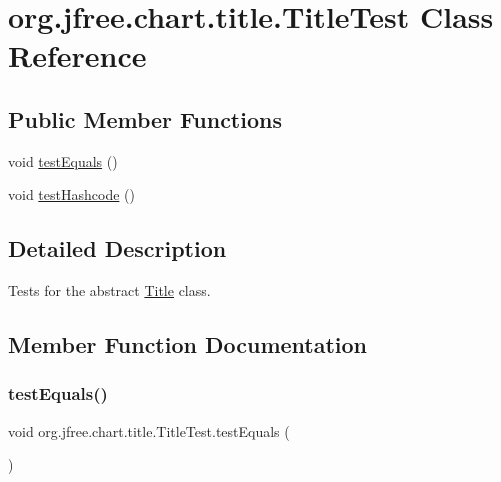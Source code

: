 \hypertarget{classorg_1_1jfree_1_1chart_1_1title_1_1_title_test}{}\section{org.\+jfree.\+chart.\+title.\+Title\+Test Class Reference}
\label{classorg_1_1jfree_1_1chart_1_1title_1_1_title_test}
\subsection*{Public Member Functions}
\begin{DoxyCompactItemize}
\item 
void \mbox{\hyperlink{classorg_1_1jfree_1_1chart_1_1title_1_1_title_test_ac27e1eaddf03cdf069af0c0cc62b873b}{test\+Equals}} ()
\item 
void \mbox{\hyperlink{classorg_1_1jfree_1_1chart_1_1title_1_1_title_test_aa3fb18f99fa8b9935f4bbb48d46c89f4}{test\+Hashcode}} ()
\end{DoxyCompactItemize}


\subsection{Detailed Description}
Tests for the abstract \mbox{\hyperlink{classorg_1_1jfree_1_1chart_1_1title_1_1_title}{Title}} class. 

\subsection{Member Function Documentation}
\mbox{\label{classorg_1_1jfree_1_1chart_1_1title_1_1_title_test_ac27e1eaddf03cdf069af0c0cc62b873b}} 
\subsubsection{\texorpdfstring{test\+Equals()}{testEquals()}}
{\footnotesize\ttfamily void org.\+jfree.\+chart.\+title.\+Title\+Test.\+test\+Equals (\begin{DoxyParamCaption}{ }\end{DoxyParamCaption})}

